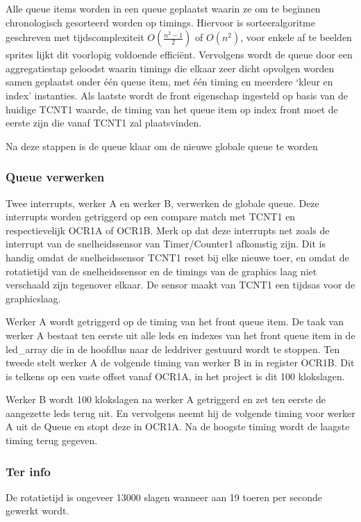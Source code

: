 \documentclass[12pt]{ugentreport}
\begin{document}
Alle queue items worden in een queue geplaatst waarin ze om te beginnen chronologisch gesorteerd worden op timings. Hiervoor is 
sorteeralgoritme geschreven met tijdscomplexiteit \(O\left (\frac{n^2-1}{2} \right )\) of \(O\left (
  n^2 \right )\), voor enkele af te beelden sprites lijkt dit voorlopig voldoende efficiënt. 
Vervolgens wordt de queue door een aggregatiestap geloodst waarin timings die elkaar zeer dicht opvolgen worden samen geplaatst onder 
één queue item, met één timing en meerdere ‘kleur en index’ instanties. Als laatste wordt de front eigenschap ingesteld op basis van de 
huidige TCNT1 waarde, de timing van het queue item op index front moet de eerste zijn die vanaf TCNT1 zal plaatsvinden.

Na deze stappen is de queue klaar om de nieuwe globale queue te worden


\subsubsection{Queue verwerken}
Twee interrupts, werker A en werker B, verwerken de globale queue. Deze interrupts worden getriggerd op een compare match met TCNT1 en 
respectievelijk OCR1A of OCR1B. Merk op dat deze interrupts net zoals de interrupt van de snelheidssensor van Timer/Counter1 afkomstig 
zijn. Dit is handig omdat de snelheidssensor TCNT1 reset bij elke nieuwe toer, en omdat de rotatietijd van de snelheidssensor en de 
timings van de graphics laag niet verschaald zijn tegenover elkaar. De sensor maakt van TCNT1 een tijdsas voor de graphicslaag.

Werker A wordt getriggerd op de timing van het front queue item. De taak van werker A bestaat ten eerste uit alle leds en indexes van 
het front queue item in de led_array die in de hoofdlus naar de leddriver gestuurd wordt te stoppen. Ten tweede stelt werker A de 
volgende timing van werker B in in register OCR1B. Dit is telkens op een vaste offset vanaf OCR1A, in het project is dit 100 
klokslagen.

Werker B wordt 100 klokslagen na werker A getriggerd en zet ten eerste de aangezette leds terug uit. En vervolgens neemt hij de 
volgende timing voor werker A uit de Queue en stopt deze in OCR1A. Na de hoogste timing wordt de laagste timing terug gegeven.


\subsubsection{Ter info}
De rotatietijd is ongeveer \num{13000} slagen wanneer aan 19 toeren per seconde gewerkt wordt.
\end{document}
